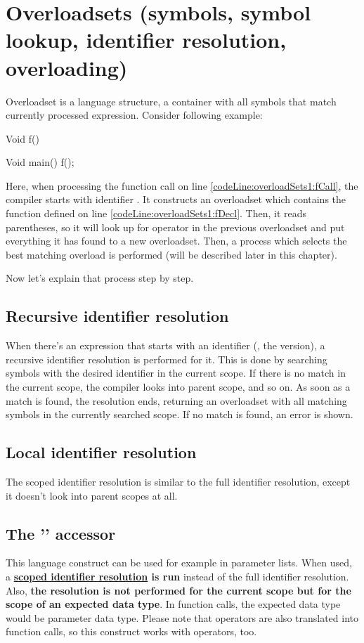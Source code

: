 \section{Overloadsets (symbols, symbol lookup, identifier resolution, overloading)}
Overloadset is a language structure, a container with all symbols that match currently processed expression. Consider following example:

\begin{code}
Void f() {}$\label{codeLine:overloadSets1:fDecl}$

Void main() {
	f();$\label{codeLine:overloadSets1:fCall}$	
}
\end{code}

Here, when processing the function call on line \ref{codeLine:overloadSets1:fCall}, the compiler starts with identifier . It constructs an overloadset which contains the function  defined on line \ref{codeLine:overloadSets1:fDecl}. Then, it reads parentheses, so it will look up for operator  in the previous overloadset and put everything it has found to a new overloadset. Then, a process which selects the best matching overload is performed (will be described later in this chapter).

Now let's explain that process step by step.

\subsection{Recursive identifier resolution} \label{fullIdentifierResolution}
When there's an expression that starts with an identifier (, the  version), a recursive identifier resolution is performed for it. This is done by searching symbols with the desired identifier in the current scope. If there is no match in the current scope, the compiler looks into parent scope, and so on. As soon as a match is found, the resolution ends, returning an overloadset with all matching symbols in the currently searched scope. If no match is found, an error is shown.

\subsection{Local identifier resolution} \label{scopedIdentifierResolution}
The scoped identifier resolution is similar to the full identifier resolution, except it doesn't look into parent scopes at all.

\subsection{The '' accessor} \label{colonAccessor}
This language construct can be used for example in parameter lists. When used, a \textbf{\hyperref[scopedIdentifierResolution]{scoped identifier resolution} is run} instead of the full identifier resolution. Also, \textbf{the resolution is not performed for the current scope but for the scope of an expected data type}. In function calls, the expected data type would be parameter data type. Please note that operators are also translated into function calls, so this construct works with operators, too.

